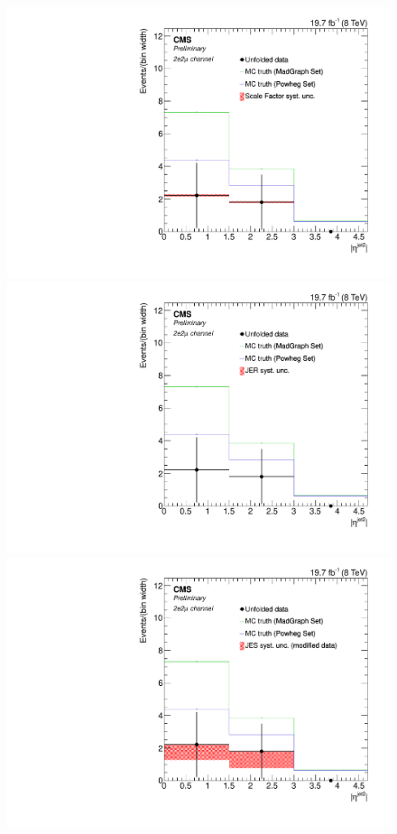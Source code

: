 \begin{figure}[hbtp]
\begin{center}
   \includegraphics[width=0.8\cmsFigWidth]{Figures/Unfolding/Systematics/ZZTo2e2m_EtaJet2_SFSq_Mad_fr}
   \includegraphics[width=0.8\cmsFigWidth]{Figures/Unfolding/Systematics/ZZTo2e2m_EtaJet2_JER_Mad_fr}
   \includegraphics[width=0.8\cmsFigWidth]{Figures/Unfolding/Systematics/ZZTo2e2m_EtaJet2_JES_ModData_Mad_fr}     

\end{center}
\end{figure}
